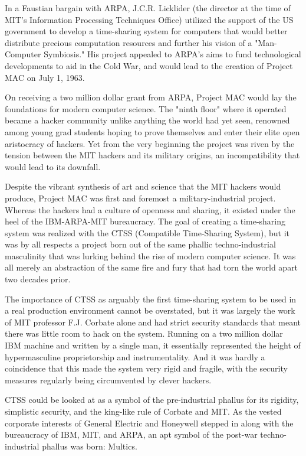 \documentclass[12pt, a5paper, twoside, openright]{memoir}
\begin{document}
In a Faustian bargain with ARPA, J.C.R. Licklider (the director at the time of MIT's Information Processing Techniques Office) utilized the support of the US government to develop a time-sharing system for computers that would better distribute precious computation resources and further his vision of a "Man-Computer Symbiosis." His project appealed to ARPA's aims to fund technological developments to aid in the Cold War, and would lead to the creation of Project MAC on July 1, 1963.

On receiving a two million dollar grant from ARPA, Project MAC would lay the foundations for modern computer science. The "ninth floor" where it operated became a hacker community unlike anything the world had yet seen, renowned among young grad students hoping to prove themselves and enter their elite open aristocracy of hackers. Yet from the very beginning the project was riven by the tension between the MIT hackers and its military origins, an incompatibility that would lead to its downfall.

Despite the vibrant synthesis of art and science that the MIT hackers would produce, Project MAC was first and foremost a military-industrial project. Whereas the hackers had a culture of openness and sharing, it existed under the heel of the IBM-ARPA-MIT bureaucracy. The goal of creating a time-sharing system was realized with the CTSS (Compatible Time-Sharing System), but it was by all respects a project born out of the same phallic techno-industrial masculinity that was lurking behind the rise of modern computer science. It was all merely an abstraction of the same fire and fury that had torn the world apart two decades prior.

The importance of CTSS as arguably the first time-sharing system to be used in a real production environment cannot be overstated, but it was largely the work of MIT professor F.J. Corbate alone and had strict security standards that meant there was little room to hack on the system. Running on a two million dollar IBM machine and written by a single man, it essentially represented the height of hypermasculine proprietorship and instrumentality. And it was hardly a coincidence that this made the system very rigid and fragile, with the security measures regularly being circumvented by clever hackers.

CTSS could be looked at as a symbol of the pre-industrial phallus for its rigidity, simplistic security, and the king-like rule of Corbate and MIT. As the vested corporate interests of General Electric and Honeywell stepped in along with the bureaucracy of IBM, MIT, and ARPA, an apt symbol of the post-war techno-industrial phallus was born: Multics.
\end{document}
